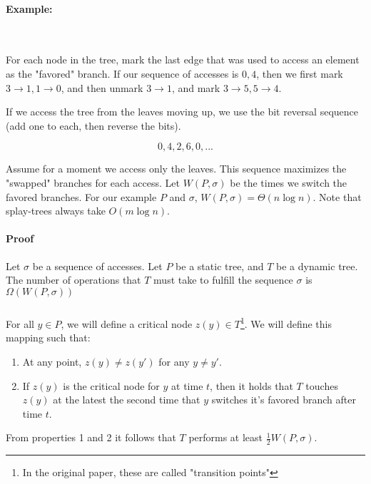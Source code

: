 \documentclass[a4paper]{article}
\begin{document}
\paragraph{Example:}\ \\

For each node in the tree, mark the last edge that was used to access an element as the "favored" branch. If our sequence of accesses is $0, 4$, then we first mark $3 \to 1, 1 \to 0$, and then unmark $3 \to 1$, and mark $3 \to 5, 5 \to 4$.

If we access the tree from the leaves moving up, we use the bit reversal sequence (add one to each, then reverse the bits).

\[0,4,2,6,0,...\]

Assume for a moment we access only the leaves. This sequence maximizes the "swapped" branches for each access.
Let $W(P, \sigma)$ be the times we switch the favored branches.
For our example $P$ and $\sigma$, $W(P, \sigma) = \Theta(n \log n)$.
Note that splay-trees always take $O(m \log n)$.

\paragraph{Proof}
Let $\sigma$ be a sequence of accesses. Let $P$ be a static tree, and $T$ be a dynamic tree. The number of operations that $T$ must take to fulfill the sequence $\sigma$ is $\Omega(W(P, \sigma))$

\subparagraph{}
For all $y \in P$, we will define a critical node $z(y)\in T$\footnote{In the original paper, these are called "transition points"}. We will define this mapping such that:

\begin{enumerate}
  \item At any point, $z(y) \ne z(y')$ for any $y \ne y'$.
  \item If $z(y)$ is the critical node for $y$ at time $t$, then it holds that $T$ touches $z(y)$ at the latest the second time that $y$ switches it's favored branch after time $t$.
\end{enumerate}

From properties 1 and 2 it follows that $T$ performs at least $\frac{1}{2} W(P, \sigma)$.
\end{document}
